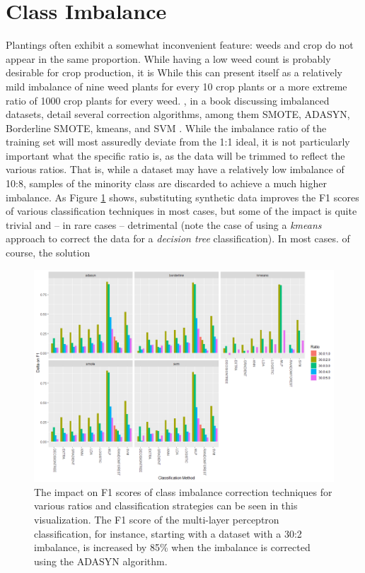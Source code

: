 \documentclass[letterpaper]{article}
\begin{document}
{\section{Class Imbalance}
Plantings often exhibit a somewhat inconvenient feature: weeds and crop do not appear in the same proportion. While having a low weed count is probably desirable for crop production, it is While this can present itself as a relatively mild imbalance of nine weed plants for every 10 crop plants or a more extreme ratio of 1000 crop plants for every weed. \citeauthor{Fernandez2018-fw}, in a book discussing imbalanced datasets, detail several correction algorithms, among them SMOTE, ADASYN, Borderline SMOTE, kmeans, and SVM \parencite{Fernandez2018-fw}. While the imbalance ratio of the training set will most assuredly deviate from the 1:1 ideal, it is not particularly important what the specific ratio is, as the data will be trimmed to reflect the various ratios. That is, while a dataset may have a relatively low imbalance of 10:8, samples of the minority class are discarded to achieve a much higher imbalance. As Figure \ref{fig:imbalance} shows, substituting synthetic data improves the F1 scores of various classification techniques in most cases, but some of the impact is quite trivial and -- in rare cases -- detrimental (note the case of using a \textit{kmeans} approach to correct the data for a \textit{decision tree} classification). In most cases. of course, the solution 
\begin{figure}[H]
	\centering
	\includegraphics[width=0.9\linewidth]{./figures/imbalance.png}
	\caption[Class imbalance correction techniques]{The impact on F1 scores of class imbalance correction techniques for various ratios and classification strategies can be seen in this visualization. The F1 score of the multi-layer perceptron classification, for instance, starting with a dataset with a 30:2 imbalance, is increased by 85\% when the imbalance is corrected using the ADASYN algorithm.}
	\label{fig:imbalance}
\end{figure}
%
%
}
\end{document}
